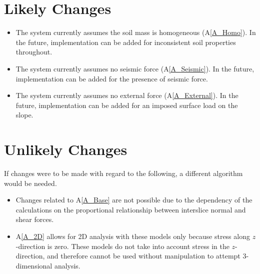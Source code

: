 \documentclass[12pt]{article}
\newcommand{\aref}[1]{A\ref{#1}}
\newcounter{lcnum} %
\newcommand{\lthelcnum}{LC\thelcnum}
\newcounter{ucnum} %
\newcommand{\ltheucnum}{UC\theucnum}
\begin{document}
\section{Likely Changes}

\noindent \begin{itemize}
\item[\refstepcounter{lcnum}\lthelcnum \label{LC_inhomogeneous}:] The system 
currently assumes the soil mass is homogeneous (\aref{A_Homo}). In the future, 
implementation can be added for inconsistent soil properties throughout.
 
\item[\refstepcounter{lcnum}\lthelcnum \label{LC_Seismic}:] The system 
currently assumes no seismic force (\aref{A_Seismic}). In the future, 
implementation can be added for the presence of seismic force.

\item[\refstepcounter{lcnum}\lthelcnum \label{LC_External}:] The system 
currently assumes no external force (\aref{A_External}).
In the future, implementation can be added for an imposed surface load on the 
slope.
\end{itemize}

\section{Unlikely Changes}
If changes were to be made with regard to the following,
a different algorithm would be needed.

\begin{itemize}
\item[\refstepcounter{ucnum}\ltheucnum \label{UC_insf}:] Changes related to 
\aref{A_Base} are not possible due to the dependency of the calculations on the 
proportional relationship between interslice normal and shear forces.
\item[\refstepcounter{ucnum}\ltheucnum \label{UC_inhomogeneous}:] \aref{A_2D} 
allows for 2D analysis with these models only because stress along 
$z$-direction is zero. These models do not take into account stress in the 
$z$-direction, and therefore cannot be used without manipulation to attempt 
3-dimensional analysis.
\end{itemize}


\end{document}
